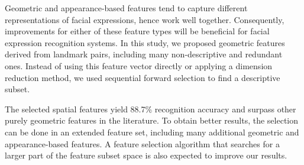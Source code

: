 \documentclass[hyperfootnotes=false]{article}
\begin{document}
Geometric and appearance-based features tend to capture different representations of facial expressions, hence work well together.
Consequently, improvements for either of these feature types will be beneficial for facial expression recognition systems.
In this study, we proposed geometric features derived from landmark pairs, including many non-descriptive and redundant ones.
Instead of using this feature vector directly or applying a dimension reduction method, we used sequential forward selection to find a descriptive subset.

The selected spatial features yield 88.7\% recognition accuracy and surpass other purely geometric features in the literature.
To obtain better results, the selection can be done in an extended feature set, including many additional geometric and appearance-based features.
A feature selection algorithm that searches for a larger part of the feature subset space is also expected to improve our results.



\end{document}
